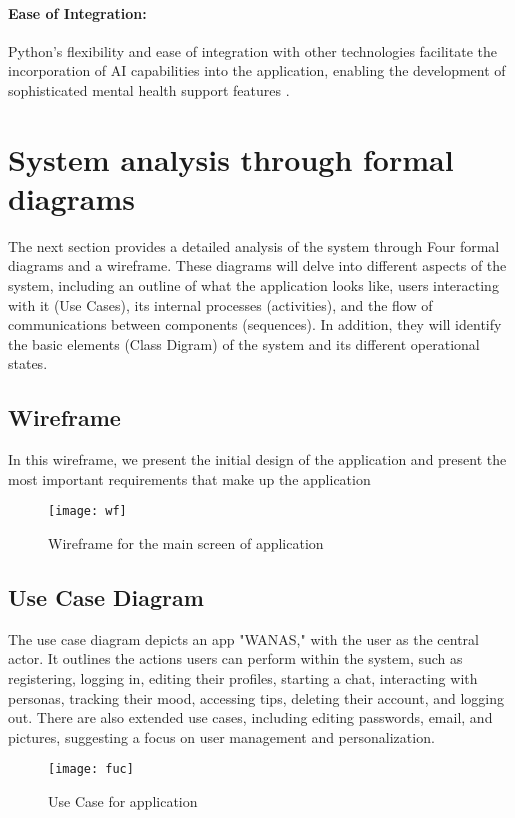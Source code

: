 \paragraph{Ease of Integration:} Python’s flexibility and ease of integration with other technologies facilitate the incorporation of AI capabilities into the application, enabling the development of sophisticated mental health support features \cite{python_integration}.


\section{System analysis through formal diagrams }

The next section provides a detailed analysis of the system through Four formal diagrams and a wireframe. These diagrams will delve into different aspects of the system, including an outline of what the application looks like, users interacting with it (Use Cases), its internal processes (activities), and the flow of communications between components (sequences). In addition, they will identify the basic elements (Class Digram) of the system and its different operational states.

\subsection{Wireframe}
In this wireframe, we present the initial design of the application and present the most important requirements that make up the application

\begin{figure}[h]
\texttt{[image: wf]}
\caption{Wireframe for the main screen of application}
\centering
\end{figure}

\subsection{Use Case Diagram }
The use case diagram depicts an app "WANAS," with the user as the central actor. It outlines the actions users can perform within the system, such as registering, logging in, editing their profiles, starting a chat, interacting with personas, tracking their mood, accessing tips, deleting their account, and logging out. There are also extended use cases, including editing passwords, email, and pictures, suggesting a focus on user management and personalization.

\begin{figure}[h]
    \texttt{[image: fuc]}
    \caption{Use Case for application}
    \centering
    \end{figure}

